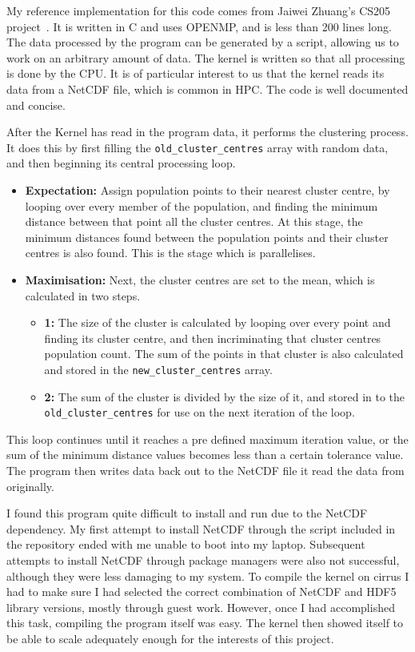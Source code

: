 My reference implementation for this code comes from Jaiwei Zhuang's CS205 project~\cite{CS205}. It is written in C and uses OPENMP, and is less than 200 lines long. The data processed by the program can be generated by a script, allowing us to work on an arbitrary amount of data. The kernel is written so that all processing is done by the CPU\@. It is of particular interest to us that the kernel reads its data from a NetCDF file, which is common in HPC\@. The code is well documented and concise.

After the Kernel has read in the program data, it performs the clustering process. It does this by first filling the \texttt{old\_cluster\_centres} array with random data, and then beginning its central processing loop.
\begin{itemize}
  \item \textbf{Expectation:} Assign population points to their nearest cluster centre, by looping over every member of the population, and finding the minimum distance between that point all the cluster centres. At this stage, the minimum distances found between the population points and their cluster centres is also found. This is the stage which is parallelises.
  \item \textbf{Maximisation:} Next, the cluster centres are set to the mean, which is calculated in two steps.
  \begin{itemize}
    \item \textbf{1:} The size of the cluster is calculated by looping over every point and finding its cluster centre, and then incriminating that cluster centres population count. The sum of the points in that cluster is also calculated and stored in the \texttt{new\_cluster\_centres} array.
   \item \textbf{2:} The sum of the cluster is divided by the size of it, and stored in to the \texttt{old\_cluster\_centres} for use on the next iteration of the loop.
   \end{itemize}
\end{itemize}
This loop continues until it reaches a pre defined maximum iteration value, or the sum of the minimum distance values becomes less than a certain tolerance value. The program then writes data back out to the NetCDF file it read the data from originally.

I found this program quite difficult to install and run due to the NetCDF dependency. My first attempt to install NetCDF through the script included in the repository ended with me unable to boot into my laptop. Subsequent attempts to install NetCDF through package managers were also not successful, although they were less damaging to my system. To compile the kernel on cirrus I had to make sure I had selected the correct combination of NetCDF and HDF5 library versions, mostly through guest work. However, once I had accomplished this task, compiling the program itself was easy. The kernel then showed itself to be able to scale adequately enough for the interests of this project.
